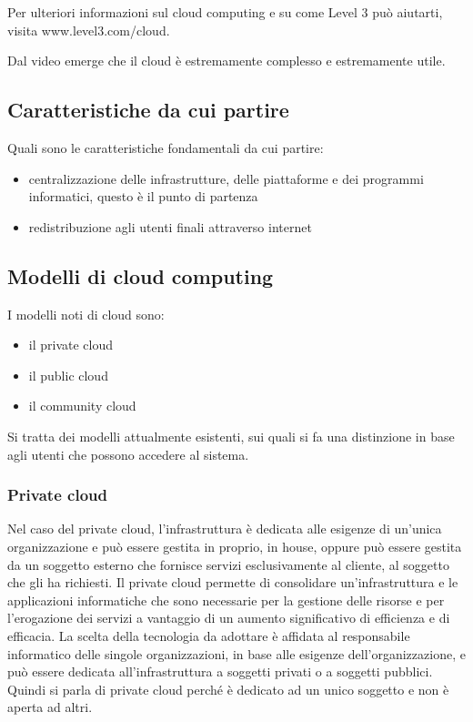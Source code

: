 Per ulteriori informazioni sul cloud computing e su come Level 3 può aiutarti, visita www.level3.com/cloud.




Dal video emerge che il cloud è estremamente complesso e estremamente utile. 
\subsection{Caratteristiche da cui partire}
Quali sono le caratteristiche fondamentali da cui partire:
\begin{itemize}
    \item centralizzazione delle infrastrutture, delle piattaforme e dei programmi informatici, questo è il punto di partenza 
    \item redistribuzione agli utenti finali attraverso internet 
\end{itemize}

\subsection{Modelli di cloud computing}
I modelli noti di cloud sono:
\begin{itemize}
    \item il private cloud
    \item il public cloud
    \item il community cloud
\end{itemize}



Si tratta dei modelli attualmente esistenti, sui quali si fa una distinzione in base agli utenti che possono accedere al sistema. 

\subsubsection{Private cloud}
Nel caso del private cloud, l'infrastruttura è dedicata alle esigenze di un'unica organizzazione e può essere gestita in proprio, in house, oppure può essere gestita da un soggetto esterno che fornisce servizi esclusivamente al cliente, al soggetto che gli ha richiesti. Il private cloud permette di consolidare un'infrastruttura e le applicazioni informatiche che sono necessarie per la gestione delle risorse e per l'erogazione dei servizi a vantaggio di un aumento significativo di efficienza e di efficacia. La scelta della tecnologia da adottare è affidata al responsabile informatico delle singole organizzazioni, in base alle esigenze dell'organizzazione, e può essere dedicata all'infrastruttura a soggetti privati o a soggetti pubblici. 
Quindi si parla di private cloud perché è dedicato ad un unico soggetto e non è aperta ad altri.

